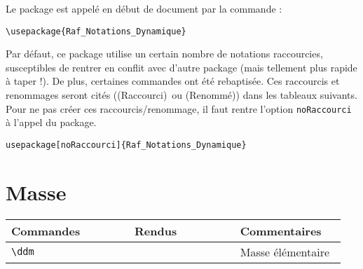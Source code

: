 \documentclass[a4paper,10pt]{article}
\newcommand{\rac}{({\color{red}Raccourci})}
\newcommand{\ren}{({\color{blue}Renommé})}
\begin{document}
	Le package est appelé en début de document par la commande :
	\begin{verbatim}
\usepackage{Raf_Notations_Dynamique}
	\end{verbatim}

	Par défaut, ce package utilise un certain nombre de notations raccourcies, susceptibles de rentrer en conflit avec d'autre package (mais tellement plus rapide à taper !).
	De plus, certaines commandes ont été rebaptisée.
	Ces raccourcis et renommages seront cités (\rac\ ou \ren) dans les tableaux suivants.
	Pour ne pas créer ces raccourcis/renommage, il faut rentre l'option \verb!noRaccourci! à l'appel du package.

	\begin{verbatim}
usepackage[noRaccourci]{Raf_Notations_Dynamique}
	\end{verbatim}

	\section{Masse}
	\noindent
	\begin{tabular}{|p{0.35\linewidth}|p{0.3\linewidth}|p{0.3\linewidth}|}
		\hline
			\textbf{Commandes}&\textbf{Rendus}&\textbf{Commentaires}
		\\\hline\hline
			\verb!\ddm!			&	\ddm			&	Masse élémentaire
		\\\hline
	\end{tabular}
	
	
\end{document}
